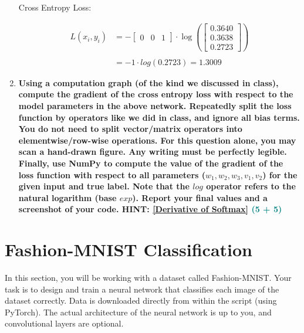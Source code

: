 \documentclass[a4paper]{article}
\begin{document}
\begin{sloppypar}
\begin{enumerate}[start=1,label=Q\arabic*,left=0pt]
    Cross Entropy Loss:

    \begin{align*}
        L(x_i, y_i) &= - \begin{bmatrix}0 & 0 & 1\end{bmatrix} \cdot \log\left(\begin{bmatrix}0.3640 \\ 0.3638 \\ 0.2723\end{bmatrix}\right) \\\\
        &= -1 \cdot log(0.2723) = 1.3009
    \end{align*}
    
    \item \textbf{Using a computation graph (of the kind we discussed in class), compute the gradient
    of the cross entropy loss with respect to the model parameters in the above network. Repeatedly split 
    the loss function by operators like we did in class, and ignore all bias terms.
    You do not need to split vector/matrix operators into elementwise/row-wise operations.
    For this question alone, you may scan a hand-drawn figure. Any writing must be perfectly
    legible. Finally, use NumPy to compute the value of the gradient of the loss function with
    respect to all parameters ($w_1, w_2, w_3, v_1, v_2$) for the given input and true label. Note that
    the $log$ operator refers to the natural logarithm (base $exp$). Report your final values and a
    screenshot of your code. HINT: \href{https://towardsdatascience.com/derivative-of-the-softmax-function-and-the-categorical-cross-entropy-loss-ffceefc081d1}{[Derivative of Softmax]} \hfill \textcolor{teal}{(5 + 5)}}
    
    \par 

\end{enumerate}

\section{Fashion-MNIST Classification}

\par In this section, you will be working with a dataset called Fashion-MNIST. Your task is to
design and train a neural network that classifies each image of the dataset correctly. Data
is downloaded directly from within the script (using PyTorch). The actual architecture of
the neural network is up to you, and convolutional layers are optional.


\end{sloppypar}
\end{document}
